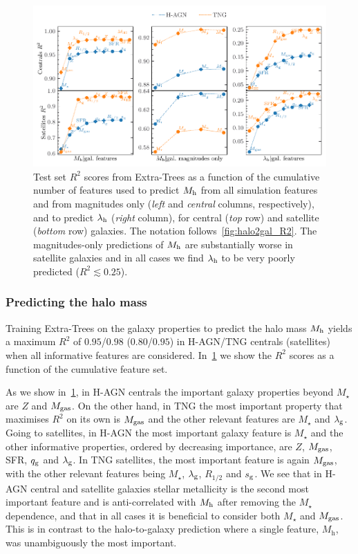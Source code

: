 \documentclass[useAMS,usenatbib]{mnras}
\begin{document}
\begin{figure}
    \centering
    \includegraphics[width=\textwidth]{Figures/haloR2s.pdf}
    \caption{Test set $R^2$ scores from Extra-Trees as a function of the cumulative number of features used to predict $M_{\rm h}$ from all simulation features and from magnitudes only (\emph{left} and \emph{central} columns, respectively), and to predict $\lambda_{\rm h}$ (\emph{right} column), for central (\emph{top} row) and satellite (\emph{bottom} row) galaxies. The notation follows~\cref{fig:halo2gal_R2}.
    The magnitudes-only predictions of $M_{\rm h}$ are substantially worse in satellite galaxies and in all cases we find $\lambda_{\rm h}$ to be very poorly predicted ($R^2 \lesssim 0.25$).}
    \label{fig:gal2halo_R2s}
\end{figure}



\subsubsection{Predicting the halo mass}\label{sec:predMhalo}

Training Extra-Trees on the galaxy properties to predict the halo mass $M_{\rm h}$ yields a maximum $R^2$ of $0.95$/$0.98$ ($0.80$/$0.95$) in H-AGN/TNG centrals (satellites) when all informative features are considered. In~\cref{fig:gal2halo_R2s} we show the $R^2$ scores as a function of the cumulative feature set.

As we show in~\cref{fig:gal2halo_R2s}, in H-AGN centrals the important galaxy properties beyond $M_\star$ are $Z$ and $M_{\rm gas}$. On the other hand, in TNG the most important property that maximises $R^2$ on its own is $M_{\rm gas}$ and the other relevant features are $M_\star$ and $\lambda_{\rm g}$. Going to satellites, in H-AGN  the most important galaxy feature is $M_\star$ and the other informative properties, ordered by decreasing importance, are $Z$, $M_{\rm gas}$, SFR, $q_{\rm g}$ and $\lambda_{\rm g}$. In TNG satellites, the most important feature is again $M_{\rm gas}$, with the other relevant features being $M_\star$, $\lambda_{\rm g}$, $R_{1/2}$ and $s_{\rm g}$. We see that in H-AGN central and satellite galaxies stellar metallicity is the second most important feature and is anti-correlated with $M_{\rm h}$ after removing the $M_\star$ dependence, and that in all cases it is beneficial to consider both $M_\star$ and $M_{\rm gas}$. This is in contrast to the halo-to-galaxy prediction where a single feature, $M_\text{h}$, was unambiguously the most important.
\end{document}
